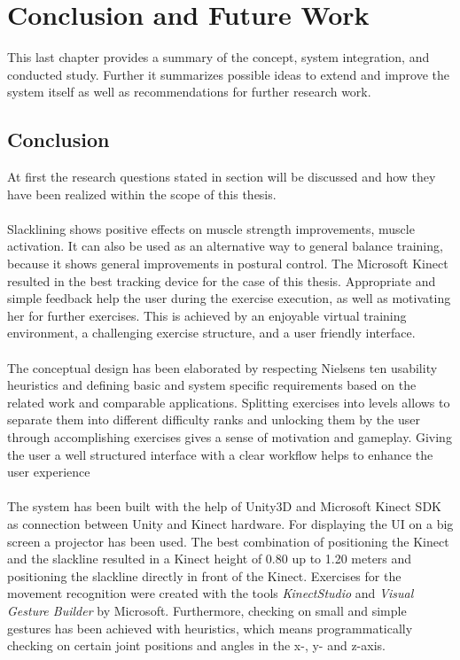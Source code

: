\chapter{Conclusion and Future Work}\label{7_conclusion}
This last chapter provides a summary of the concept, system integration, and conducted study.
Further it summarizes possible ideas to extend and improve the system itself as well as recommendations for further research work.

\section{Conclusion}
At first the research questions stated in section \textit{} will be discussed and how they have been realized within the scope of this thesis.

\subsubsection{}
Slacklining shows positive effects on muscle strength improvements, muscle activation.
It can also be used as an alternative way to general balance training, because it shows general improvements in postural control.
The Microsoft Kinect resulted in the best tracking device for the case of this thesis.
Appropriate and simple feedback help the user during the exercise execution, as well as motivating her for further exercises.
This is achieved by an enjoyable virtual training environment, a challenging exercise structure, and a user friendly interface.


\subsubsection{}
The conceptual design has been elaborated by respecting Nielsens ten usability heuristics and defining basic and system specific requirements based on the related work and comparable applications.
Splitting exercises into levels allows to separate them into different difficulty ranks and unlocking them by the user through accomplishing exercises gives a sense of motivation and gameplay.
Giving the user a well structured interface with a clear workflow helps to enhance the user experience

\subsubsection{}
The system has been built with the help of Unity3D and Microsoft Kinect SDK as connection between Unity and Kinect hardware.
For displaying the UI on a  big screen a projector has been used.
The best combination of positioning the Kinect and the slackline resulted in a Kinect height of 0.80 up to 1.20 meters and positioning the slackline directly in front of the Kinect.
Exercises for the movement recognition were created with the tools \textit{KinectStudio} and \textit{Visual Gesture Builder} by Microsoft.
Furthermore, checking on small and simple gestures has been achieved with heuristics, which means programmatically checking on certain joint positions and angles in the x-, y- and z-axis.

